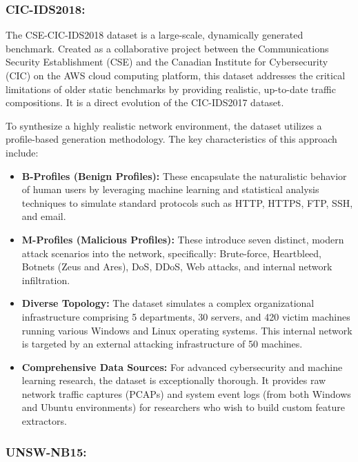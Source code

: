 \documentclass[12pt, a4paper]{report}
\begin{document}
\subsubsection{CIC-IDS2018:}

The CSE-CIC-IDS2018 \cite{cic2018dataset} dataset is a large-scale, dynamically generated benchmark. Created as a collaborative project between the Communications Security Establishment (CSE) and the Canadian Institute for Cybersecurity (CIC) on the AWS cloud computing platform, this dataset addresses the critical limitations of older static benchmarks by providing realistic, up-to-date traffic compositions. It is  a direct evolution of the CIC-IDS2017 dataset.
 
To synthesize a highly realistic network environment, the dataset utilizes a profile-based generation methodology. The key characteristics of this approach include:

\begin{itemize}
    \item \textbf{B-Profiles (Benign Profiles):} These encapsulate the naturalistic behavior of human users by leveraging machine learning and statistical analysis techniques to simulate standard protocols such as HTTP, HTTPS, FTP, SSH, and email.
    
    \item \textbf{M-Profiles (Malicious Profiles):} These introduce seven distinct, modern attack scenarios into the network, specifically: Brute-force, Heartbleed, Botnets (Zeus and Ares), DoS, DDoS, Web attacks, and internal network infiltration.
    
    \item \textbf{Diverse Topology:} The dataset simulates a complex organizational infrastructure comprising 5 departments, 30 servers, and 420 victim machines running various Windows and Linux operating systems. This internal network is targeted by an external attacking infrastructure of 50 machines.
    
    \item \textbf{Comprehensive Data Sources:} For advanced cybersecurity and machine learning research, the dataset is exceptionally thorough. It provides raw network traffic captures (PCAPs) and system event logs (from both Windows and Ubuntu environments) for researchers who wish to build custom feature extractors.
\end{itemize}


\subsubsection{UNSW-NB15:}
\end{document}
